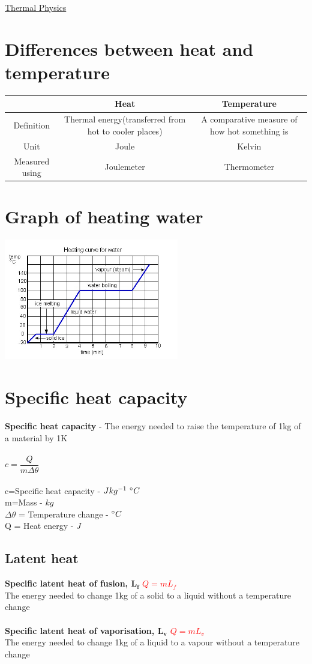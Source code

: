\documentclass{article}[18pt]
\begin{document}
\begin{center}
\underline{\huge Thermal Physics}
\end{center}
\section{Differences between heat and temperature}
\begin{tabular}{|c|c|c|}
\hline
&Heat&Temperature\\
\hline
Definition&Thermal energy(transferred from hot to cooler places)&A comparative measure of how hot something is\\
\hline
Unit&Joule&Kelvin\\
\hline
Measured using&Joulemeter&Thermometer\\
\hline
\end{tabular}
\section{Graph of heating water}
\includegraphics[width=3in]{water_heat_curve.jpg}
\section{Specific heat capacity}
\textbf{Specific heat capacity} - The energy needed to raise the temperature of 1kg of a material by 1K\\
\\
$c=\dfrac{Q}{m\Delta\theta}$\\
\\
c=Specific heat capacity - $Jkg^{-1} \ \degree C$\\
m=Mass - $kg$\\
$\Delta\theta$ = Temperature change - $\degree C$\\
Q = Heat energy - $J$
\subsection{Latent heat}
\textbf{Specific latent heat of fusion, $\mathbf{L_f}$} \quad \textcolor{red}{$Q=mL_f$}\\
The energy needed to change 1kg of a solid to a liquid without a temperature change\\
\\
\textbf{Specific latent heat of vaporisation, $\mathbf{L_v}$} \quad \textcolor{red}{$Q=mL_v$}\\
The energy needed to change 1kg of a liquid to a vapour without a temperature change
\end{document}
